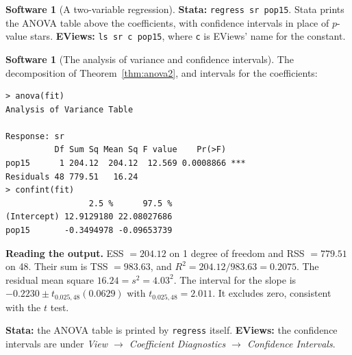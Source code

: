 \documentclass[11pt,a4paper]{article}
\numberwithin{equation}{section}
\theoremstyle{definition}
\newtheorem{software}[thm]{Software}
\begin{document}
\begin{software}[A two-variable regression]
\textbf{Stata:} \texttt{regress sr pop15}. Stata prints the ANOVA table above the coefficients, with confidence intervals in place of $p$-value stars.
\textbf{EViews:} \texttt{ls sr c pop15}, where \texttt{c} is EViews' name for the constant.
\end{software}

\begin{software}[The analysis of variance and confidence intervals]
\label{sw:anova}
The decomposition of Theorem~\ref{thm:anova2}, and intervals for the coefficients:
{\small\begin{verbatim}
> anova(fit)
Analysis of Variance Table

Response: sr
          Df Sum Sq Mean Sq F value    Pr(>F)
pop15      1 204.12  204.12  12.569 0.0008866 ***
Residuals 48 779.51   16.24
> confint(fit)
                 2.5 %      97.5 %
(Intercept) 12.9129180 22.08027686
pop15       -0.3494978 -0.09653739
\end{verbatim}}
\textbf{Reading the output.} ESS $= 204.12$ on 1 degree of freedom and RSS $= 779.51$ on 48. Their sum is TSS $= 983.63$, and
$R^2 = 204.12/983.63 = 0.2075$. The residual mean square $16.24 = s^2 = 4.03^2$. The interval for the slope is
$-0.2230 \pm t_{0.025,48}(0.0629)$ with $t_{0.025,48} = 2.011$. It excludes zero, consistent with the $t$ test.

\textbf{Stata:} the ANOVA table is printed by \texttt{regress} itself. \textbf{EViews:} the confidence intervals are under
\emph{View $\to$ Coefficient Diagnostics $\to$ Confidence Intervals}.
\end{software}
\end{document}
